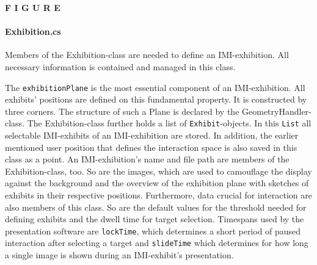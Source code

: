 \textbf{F I G U R E}


%

\paragraph{Exhibition.cs} Members of the Exhibition-class are needed to define an \ac{IMI}-exhibition. All necessary information is contained and managed in this class.

The \texttt{exhibitionPlane} is the most essential component of an \ac{IMI}-exhibition. All exhibits' positions are defined on this fundamental property. It is constructed by three corners. The structure of such a Plane is declared by the GeometryHandler-class. The Exhibition-class further holds a list of \texttt{Exhibit}-objects. In this \texttt{List} all selectable \ac{IMI}-exhibits of an \ac{IMI}-exhibition are stored. In addition, the earlier mentioned user position that defines the interaction space is also saved in this class as a point. An \ac{IMI}-exhibition's name and file path are members of the Exhibition-class, too. So are the images, which are used to camouflage the display against the background and the overview of the exhibition plane with sketches of exhibits in their respective positions. Furthermore, data crucial for interaction are also members of this class. So are the default values for the threshold needed for defining exhibits and the dwell time for target selection. Timespans used by the presentation software are \texttt{lockTime}, which determines a short period of paused interaction after selecting a target and \texttt{slideTime} which determines for how long a single image is shown during an \ac{IMI}-exhibit's presentation.


